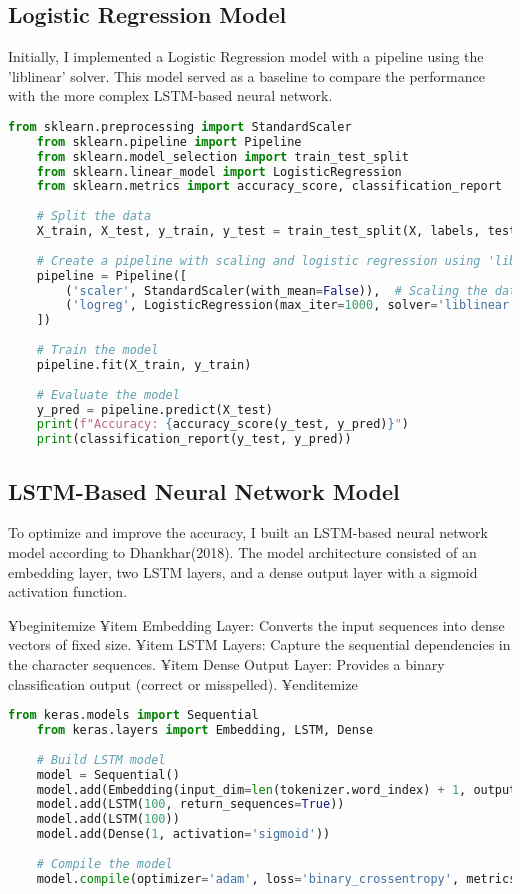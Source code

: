 \subsection{Logistic Regression Model}
Initially, I implemented a Logistic Regression model with a pipeline using the 'liblinear' solver. This model served as a baseline to compare the performance with the more complex LSTM-based neural network.
\begin{lstlisting}[language=Python, caption=Data Collection and Preprocessing]
    from sklearn.preprocessing import StandardScaler
    from sklearn.pipeline import Pipeline
    from sklearn.model_selection import train_test_split
    from sklearn.linear_model import LogisticRegression
    from sklearn.metrics import accuracy_score, classification_report
    
    # Split the data
    X_train, X_test, y_train, y_test = train_test_split(X, labels, test_size=0.2, random_state=42)
    
    # Create a pipeline with scaling and logistic regression using 'liblinear' solver
    pipeline = Pipeline([
        ('scaler', StandardScaler(with_mean=False)),  # Scaling the data
        ('logreg', LogisticRegression(max_iter=1000, solver='liblinear'))  # Use 'liblinear' solver
    ])
    
    # Train the model
    pipeline.fit(X_train, y_train)
    
    # Evaluate the model
    y_pred = pipeline.predict(X_test)
    print(f"Accuracy: {accuracy_score(y_test, y_pred)}")
    print(classification_report(y_test, y_pred))
\end{lstlisting}


\subsection{LSTM-Based Neural Network Model}
To optimize and improve the accuracy, I built an LSTM-based neural network model according to Dhankhar(2018)\cite{DhanLSTM}. The model architecture consisted of an embedding layer, two LSTM layers, and a dense output layer with a sigmoid activation function.

¥begin{itemize}
    ¥item Embedding Layer: Converts the input sequences into dense vectors of fixed size.
    ¥item LSTM Layers: Capture the sequential dependencies in the character sequences.
    ¥item Dense Output Layer: Provides a binary classification output (correct or misspelled).
¥end{itemize}

\begin{lstlisting}[language=Python, caption=Data Collection and Preprocessing]
    from keras.models import Sequential
    from keras.layers import Embedding, LSTM, Dense
    
    # Build LSTM model
    model = Sequential()
    model.add(Embedding(input_dim=len(tokenizer.word_index) + 1, output_dim=50, input_length=max_seq_length))
    model.add(LSTM(100, return_sequences=True))
    model.add(LSTM(100))
    model.add(Dense(1, activation='sigmoid'))
    
    # Compile the model
    model.compile(optimizer='adam', loss='binary_crossentropy', metrics=['accuracy'])
    
\end{lstlisting}

